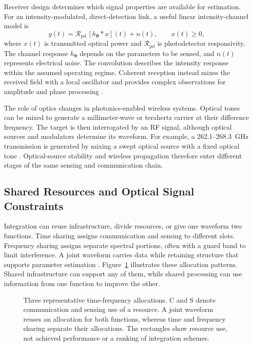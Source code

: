 Receiver design determines which signal properties are available for
estimation. For an intensity-modulated, direct-detection link, a useful
linear intensity-channel model is
\begin{equation}
y(t)=\mathcal{R}_{\mathrm{pd}}\,[h_{\boldsymbol{\theta}}*x](t)+n(t),
\qquad x(t)\geq 0,
\label{eq:imdd_observation}
\end{equation}
where $x(t)$ is transmitted optical power and
$\mathcal{R}_{\mathrm{pd}}$ is photodetector responsivity. The channel response
$h_{\boldsymbol{\theta}}$ depends on the parameters to be sensed, and $n(t)$
represents electrical noise. The convolution describes the intensity response
within the assumed operating regime. Coherent reception instead mixes the
received field with a local oscillator and provides complex observations for
amplitude and phase processing
\cite{Wen2024OISACArchitectures,OISAC_SCR00057}.

The role of optics changes in photonics-enabled wireless systems. Optical
tones can be mixed to generate a millimeter-wave or terahertz carrier at their
difference frequency. The target is then interrogated by an RF signal, although
optical sources and modulators determine its waveform. For example, a
262.1--268.3~GHz transmission is generated by mixing a swept optical source
with a fixed optical tone \cite{OISAC_SCR00083}. Optical-source stability and
wireless propagation therefore enter different stages of the same sensing
and communication chain.

\subsection{Shared Resources and Optical Signal Constraints}
\label{sec:shared_resources_constraints}

Integration can reuse infrastructure, divide resources, or give one waveform
two functions. Time sharing assigns communication and sensing to different
slots. Frequency sharing assigns separate spectral portions, often with a
guard band to limit interference. A joint waveform carries data while
retaining structure that supports parameter estimation
\cite{Wen2024OISACArchitectures,Lyu2026PhotonicTHzWaveforms}.
Figure~\ref{fig:resource_sharing} illustrates these allocation patterns.
Shared infrastructure can support any of them, while shared processing can
use information from one function to improve the other.

\begin{figure}[!t]
\centering

\caption{Three representative time-frequency allocations. C and S denote
communication and sensing use of a resource. A joint waveform reuses an
allocation for both functions, whereas time and frequency sharing separate
their allocations. The rectangles show resource use, not achieved performance
or a ranking of integration schemes.}
\label{fig:resource_sharing}
\end{figure}

